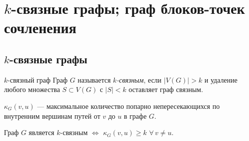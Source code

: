 \section{\texorpdfstring{$k$}{k}-связные графы; граф блоков-точек сочленения}

\subsection{\texorpdfstring{$k$}{k}-связные графы}

\begin{Definition}{$k$-связный граф}{}
  Граф $G$ называется \emph{$k$-связным}, если
  $|V(G)| > k$ и удаление любого множества $S \subset V(G)$
  с $|S| < k$ оставляет граф связным.
\end{Definition}

\begin{Definition}{}{}
  $\kappa_G(v, u)$ — максимальное количество попарно непересекающихся
  по внутренним вершинам путей от $v$ до $u$ в графе $G$.
\end{Definition}

\begin{Theorem}{}{}
  Граф $G$ является $k$-связным $\Leftrightarrow$
  $\kappa_G(v, u) \geq k$ \; $\forall\, v \neq u$.
\end{Theorem}


